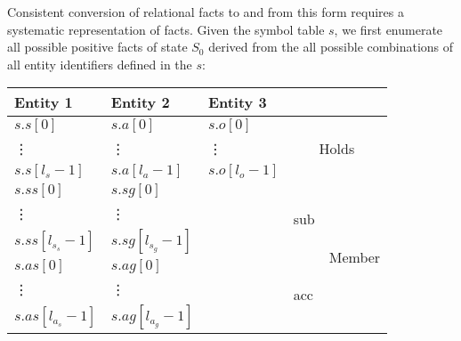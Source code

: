 \documentclass[10pt, twocolumn]{article}
\begin{document}
          Consistent conversion of relational facts to and from this form
          requires a systematic representation of facts. Given the symbol table
          $s$, we first enumerate all possible positive facts of state $S_{0}$
          derived from the all possible combinations of all entity identifiers
          defined in the $s$:

          \begin{tabular}[t]{|l|l|l|l|l|}
            \hline
            \textbf{Entity 1} &
            \textbf{Entity 2} &
            \textbf{Entity 3} &
            \multicolumn{2}{|l|}{\textbf{}} \\
            \hline
            $s.s[0]$ &
            $s.a[0]$ &
            $s.o[0]$ &
            \multicolumn{2}{|c|}{\multirow{3}{*}{\begin{sideways}Holds\end{sideways}}} \\
            \vdots & \vdots & \vdots & \multicolumn{2}{|c|}{} \\
            $s.s[l_{s} - 1]$ &
            $s.a[l_{a} - 1]$ &
            $s.o[l_{o} - 1]$ &
            \multicolumn{2}{|c|}{} \\
            \hline
            $s.ss[0]$ &
            $s.sg[0]$ &
            &
            \multirow{3}{*}{\begin{sideways}sub\end{sideways}} &
            \multirow{9}{*}{\begin{sideways}Member\end{sideways}} \\
            \vdots & \vdots & & & \\
            $s.ss[l_{s_{s}} - 1]$ & $s.sg[l_{s_{g}} - 1]$ & & & \\
            \cline{1-4}
            $s.as[0]$ &
            $s.ag[0]$ &
            &
            \multirow{3}{*}{\begin{sideways}acc\end{sideways}} & \\
            \vdots & \vdots & & & \\
            $s.as[l_{a_{s}} - 1]$ & $s.ag[l_{a_{g}} - 1]$ & & & \\
            \cline{1-4}

\end{tabular}
\end{document}
